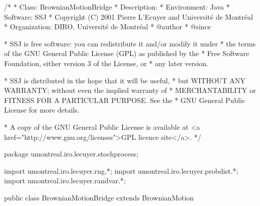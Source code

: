 \begin{code}
\begin{hide}
/*
 * Class:        BrownianMotionBridge
 * Description:  
 * Environment:  Java
 * Software:     SSJ 
 * Copyright (C) 2001  Pierre L'Ecuyer and Université de Montréal
 * Organization: DIRO, Université de Montréal
 * @author       
 * @since

 * SSJ is free software: you can redistribute it and/or modify it under
 * the terms of the GNU General Public License (GPL) as published by the
 * Free Software Foundation, either version 3 of the License, or
 * any later version.

 * SSJ is distributed in the hope that it will be useful,
 * but WITHOUT ANY WARRANTY; without even the implied warranty of
 * MERCHANTABILITY or FITNESS FOR A PARTICULAR PURPOSE.  See the
 * GNU General Public License for more details.

 * A copy of the GNU General Public License is available at
   <a href="http://www.gnu.org/licenses">GPL licence site</a>.
 */
\end{hide}
package umontreal.iro.lecuyer.stochprocess;\begin{hide}
import umontreal.iro.lecuyer.rng.*;
import umontreal.iro.lecuyer.probdist.*;
import umontreal.iro.lecuyer.randvar.*;

\end{hide}

public class BrownianMotionBridge extends BrownianMotion \begin{hide} {
    protected int          bridgeCounter = -1; // Before 1st observ

    // For precomputations for B Bridge
    protected double[]     wMuDt,
                           wSqrtDt;
    protected int[]        wIndexList,
                           ptIndex;
\end{hide}
\end{code}

